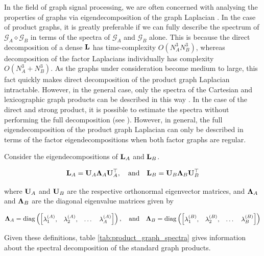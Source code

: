In the field of graph signal processing, we are often concerned with analysing the properties of graphs via eigendecomposition of the graph Laplacian \citep{Mieghem2010}. In the case of product graphs, it is greatly preferable if we can fully describe the spectrum of $\mathcal{G}_A \diamond \mathcal{G}_B$ in terms of the spectra of $\mathcal{G}_A$ and $\mathcal{G}_B$ alone. This is because the direct decomposition of a dense $\mathbf{L}$ has time-complexity $O(N_A^3N_B^3)$, whereas decomposition of the factor Laplacians individually has complexity $O(N_A^3 + N_B^3)$. As the graphs under consideration become medium to large, this fact quickly makes direct decomposition of the product graph Laplacian intractable. However, in the general case, only the spectra of the Cartesian and lexicographic graph products can be described in this way \citep{Barik2018}. In the case of the direct and strong product, it is possible to estimate the spectra without performing the full decomposition (see \citep{Sayama2016}). However, in general, the full eigendecomposition of the product graph Laplacian can only be described in terms of the factor eigendecompositions when both factor graphs are regular.


Consider the eigendecompositions of $\mathbf{L}_A$ and $\mathbf{L}_B$.

\begin{equation}
    \mathbf{L}_A = \mathbf{U}_A \mathbf{\Lambda}_A \mathbf{U}_A^\top, \quad \text{and} \quad \mathbf{L}_B = \mathbf{U}_B \mathbf{\Lambda}_B \mathbf{U}_B^\top
\end{equation}

where $\mathbf{U}_A$ and $\mathbf{U}_B$ are the respective orthonormal eigenvector matrices, and $\mathbf{\Lambda}_A$ and $\mathbf{\Lambda}_B$ are the diagonal eigenvalue matrices given by

\begin{equation*}
    \mathbf{\Lambda}_A = \text{\textup{diag}}\left(\begin{bmatrix} \lambda_1^{(A)}, & \lambda_2^{(A)}, & \dots & \lambda_A^{(A)} \end{bmatrix}\right),
    \quad \text{and} \quad
    \mathbf{\Lambda}_B = \text{\textup{diag}}\left(\begin{bmatrix} \lambda_1^{(B)}, & \lambda_2^{(B)}, & \dots & \lambda_B^{(B)} \end{bmatrix}\right)
\end{equation*}

Given these definitions, table \ref{tab:product_graph_spectra} gives information about the spectral decomposition of the standard graph products.

